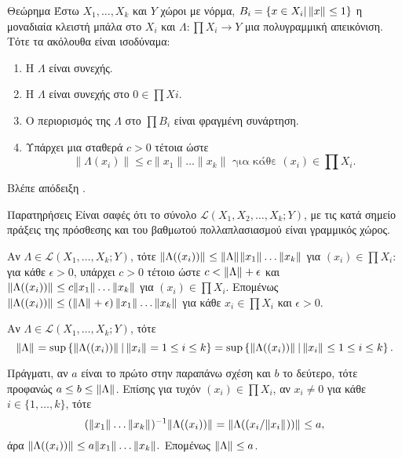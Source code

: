 \begin{namedthrm}{Θεώρημα} 
    Έστω $X_1,\ldots,X_k$ και $Y$ χώροι με νόρμα, $B_i = \{x \in X_i | \, 
    \|x\|_{} \leq 1\}$ η μοναδιαία κλειστή μπάλα στο $X_i$ και $\Lambda: \prod 
    X_i \rightarrow Y$ μια πολυγραμμική απεικόνιση. Τότε τα ακόλουθα είναι 
    ισοδύναμα:
    \begin{enumerate}
        \item Η $\Lambda$ είναι συνεχής.
        \item Η $\Lambda$ είναι συνεχής στο $0 \in \prod Xi$.
        \item Ο περιορισμός της $\Lambda$ στο $\prod B_i$ είναι φραγμένη 
        συνάρτηση.
        \item Υπάρχει μια σταθερά $c>0$ τέτοια ώστε 
        \begin{equation*}
            \|\Lambda(x_i)\| \leq c\|x_1\|\ldots\|x_k\| \text{ για κάθε } 
            (x_i) \in \prod X_i.
        \end{equation*}
    \end{enumerate}
    Βλέπε απόδειξη \cite{cartan_71:diff_calculus}.
\end{namedthrm}
\begin{nameddefn*}{Παρατηρήσεις}
    Είναι σαφές ότι το σύνολο $\mathcal L (X_1,X_2,\ldots,X_k;Y)$, με τις κατά 
    σημείο πράξεις της πρόσθεσης και του βαθμωτού πολλαπλασιασμού είναι 
    γραμμικός χώρος.

    Αν $\Lambda \in \mathcal L(X_1,\ldots,X_k;Y)$, τότε $\|
    \Lambda((x_i))\|_{} \le \|\Lambda\|_{} \|x_1\|_{} \ldots \|x_k\|_{}$ για $(x_i) \in
    \prod X_i$: για κάθε $\epsilon > 0$, υπάρχει $c >0$ τέτοιο ώστε $c <\|\Lambda\|_{} + \epsilon$ και $ \|\Lambda((x_i))\|_{} \le c \|x_1\|_{} \ldots 
    \|x_k\|_{}$ για $(x_i) \in \prod X_i$. Επομένως $\|\Lambda ((x_i))\|_{}
    \le \left(\|\Lambda\|_{} + \epsilon\right)\|x_1\|_{} \ldots \|x_k\|_{}$ για 
    κάθε $x_i \in \prod X_i$ και $\epsilon >0$.

    Αν $\Lambda \in \mathcal L(X_1,\ldots,X_k;Y)$, τότε
    \[\|\Lambda\|_{} = \sup\left\{\|\Lambda((x_i))\|_{}\,|\,\|x_i\|_{} = 1\le 
    i\le k\right\} =\sup\left\{\|\Lambda((x_i))\|_{}\,|\,\|x_i\|_{} \le 1 \le 
    i\le k\right\}.\]

Πράγματι, αν $a$ είναι το πρώτο  στην παραπάνω σχέση και $b$ το 
δεύτερο, τότε προφανώς $a\le b\le \|\Lambda\|_{}$. Επίσης για τυχόν $(x_i) \in
\prod X_i$, αν $x_i \ne 0$ για κάθε $i \in \{1,\ldots,k\}$, τότε
\[(\|x_1\|_{} \ldots \|x_k\|_{})^{-1}\|\Lambda((x_i))\|_{} = \|
    \Lambda((x_i/\|x_i\|_{}))\|_{} \le a,\]
άρα $\|\Lambda((x_i))\|_{} \le a\|x_1\|_{} \ldots \|x_k\|_{}.$ Επομένως 
$\|\Lambda\|_{} \le a$.
\end{nameddefn*}

